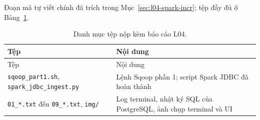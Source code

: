 \documentclass[
  12pt,
  a4paper,
]{article}
\begin{document}
Đoạn mã tự viết chính đã trích trong Mục~\ref{sec:l04-spark-incr}; tệp
đầy đủ ở Bảng~\ref{tbl:l04-files}.

\begin{longtable}[]{@{}
  >{\raggedright\arraybackslash}p{}
  >{\raggedright\arraybackslash}p{}@{}}
\caption{\label{tbl:l04-files}Danh mục tệp nộp kèm báo cáo
L04.}\tabularnewline
\toprule\noalign{}
\begin{minipage}[b]{\linewidth}\raggedright
Tệp
\end{minipage} & \begin{minipage}[b]{\linewidth}\raggedright
Nội dung
\end{minipage} \\
\midrule\noalign{}
\endfirsthead
\toprule\noalign{}
\begin{minipage}[b]{\linewidth}\raggedright
Tệp
\end{minipage} & \begin{minipage}[b]{\linewidth}\raggedright
Nội dung
\end{minipage} \\
\midrule\noalign{}
\endhead
\bottomrule\noalign{}
\endlastfoot
\texttt{sqoop\_part1.sh},
\texttt{spark\_}\allowbreak{}\texttt{jdbc\_}\allowbreak{}\texttt{ingest.}\allowbreak{}\texttt{py}\allowbreak{}
& Lệnh Sqoop phần 1; script Spark JDBC đã hoàn thành \\
\texttt{01\_*.txt} đến \texttt{09\_*.txt}, \texttt{img/} & Log terminal,
nhật ký SQL của PostgreSQL, ảnh chụp terminal và UI \\
\end{longtable}
\end{document}
